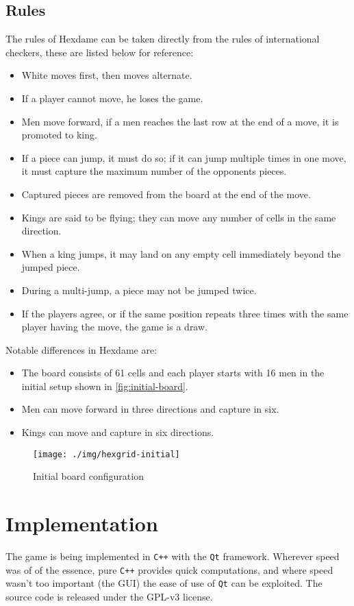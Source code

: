 \documentclass[a4paper,10pt]{article}
\begin{document}
\subsection{Rules}
The rules of Hexdame can be taken directly from the rules of international checkers, these are listed below for reference:
\begin{itemize}
 \item White moves first, then moves alternate.
 \item If a player cannot move, he loses the game.
 \item Men move forward, if a men reaches the last row at the end of a move, it is promoted to king.
 \item If a piece can jump, it must do so; if it can jump multiple times in one move, it must capture the maximum number of the opponents pieces.
 \item Captured pieces are removed from the board at the end of the move.
 \item Kings are said to be flying; they can move any number of cells in the same direction.
 \item When a king jumps, it may land on any empty cell immediately beyond the jumped piece.
 \item During a multi-jump, a piece may not be jumped twice.
 \item If the players agree, or if the same position repeats three times with the same player having the move, the game is a draw.
\end{itemize}

Notable differences in Hexdame are:
\begin{itemize}
 \item The board consists of 61 cells and each player starts with 16 men in the initial setup shown in \autoref{fig:initial-board}.
 \item Men can move forward in three directions and capture in six.
 \item Kings can move and capture in six directions.
\end{itemize}

\begin{figure}
 \centering
 \texttt{[image: ./img/hexgrid-initial]}
 \caption{Initial board configuration}
 \label{fig:initial-board}
\end{figure}

\section{Implementation}
The game is being implemented in \texttt{C++} with the \texttt{Qt} framework. Wherever speed was of of the essence, pure \texttt{C++} provides quick computations, and where speed wasn't too important (the GUI) the ease of use of \texttt{Qt} can be exploited. The source code is released under the GPL-v3 license.
\end{document}
